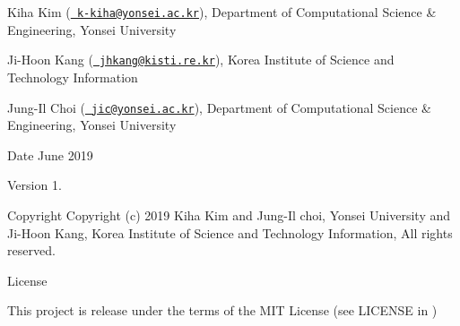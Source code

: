 \begin{DoxyItemize}
\item Kiha Kim (\href{mailto:k-kiha@yonsei.ac.kr}{\texttt{ k-\/kiha@yonsei.\+ac.\+kr}}), Department of Computational Science \& Engineering, Yonsei University
\item Ji-\/\+Hoon Kang (\href{mailto:jhkang@kisti.re.kr}{\texttt{ jhkang@kisti.\+re.\+kr}}), Korea Institute of Science and Technology Information
\item Jung-\/\+Il Choi (\href{mailto:jic@yonsei.ac.kr}{\texttt{ jic@yonsei.\+ac.\+kr}}), Department of Computational Science \& Engineering, Yonsei University
\end{DoxyItemize}

\begin{DoxyDate}{Date}
June 2019 
\end{DoxyDate}
\begin{DoxyVersion}{Version}
1. 
\end{DoxyVersion}
\begin{DoxyParagraph}{Copyright}
Copyright (c) 2019 Kiha Kim and Jung-\/\+Il choi, Yonsei University and Ji-\/\+Hoon Kang, Korea Institute of Science and Technology Information, All rights reserved. 
\end{DoxyParagraph}
\begin{DoxyParagraph}{License }

\end{DoxyParagraph}
This project is release under the terms of the M\+IT License (see L\+I\+C\+E\+N\+SE in ) 